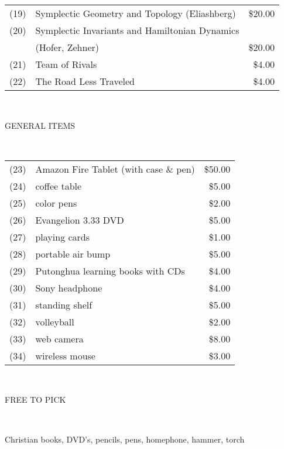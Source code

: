 \documentclass{article}[12pt]
\begin{document}
\newpage
\colorbox{lime!10}{\begin{minipage}{297.5pt} \color{blue}
\begin{tabular}{rlr}
(19) & Symplectic Geometry and Topology (Eliashberg)  & \$20.00 \\[0.05in]
(20) & Symplectic Invariants and Hamiltonian Dynamics & \\
& (Hofer, Zehner) & \$20.00 \\[0.05in]
(21) & Team of Rivals & \$4.00 \\[0.05in]
(22) & The Road Less Traveled & \$4.00
\end{tabular} \end{minipage}} \\
\colorbox{blue!10}{\begin{minipage}{294pt}
\begin{center} {\color{orange} \large GENERAL ITEMS} \end{center}
\end{minipage} } \\
\colorbox{cyan!10}{\begin{minipage}{297.5pt} \color{violet}
\begin{tabular}{rlr}
(23) & Amazon Fire Tablet (with case \& pen) \hspace{44pt} & \$50.00 \\[0.05in] 
(24) & coffee table & \$5.00 \\[0.05in]
(25) & color pens & \$2.00 \\[0.05in]
(26) & Evangelion 3.33 DVD & \$5.00 \\[0.05in]
(27) & playing cards &\$1.00 \\[0.05in]
(28) & portable air bump & \$5.00 \\[0.05in]
(29) & Putonghua learning books with CDs & \$4.00 \\[0.05in]
(30) & Sony headphone & \$4.00 \\[0.05in]
(31) & standing shelf & \$5.00 \\[0.05in]
(32) & volleyball & \$2.00 \\[0.05in]
(33) & web camera & \$8.00 \\[0.05in]
(34) & wireless mouse & \$3.00 
\end{tabular} \end{minipage}} \\
\colorbox{pink!10}{\begin{minipage}{297.5pt}
\begin{center} FREE TO PICK \end{center}
\end{minipage}} \\
\colorbox{lime!10}{\begin{minipage}{297.5pt} \color{blue}
\begin{center}Christian books, DVD's, pencils, pens, homephone, hammer, torch\end{center}
\end{minipage}} \\
\end{document}
